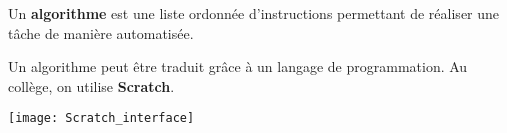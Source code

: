 \begin{definition}
   Un {\bf algorithme} est une liste ordonnée d'instructions permettant
de réaliser une tâche de manière automatisée.
\end{definition}

\bigskip

Un algorithme peut être traduit grâce à un langage de programmation. Au collège, on utilise {\bf Scratch}.

\begin{center}
   \texttt{[image: Scratch\_interface]}
\end{center}

\vspace*{-10mm}


\exercicesbase


